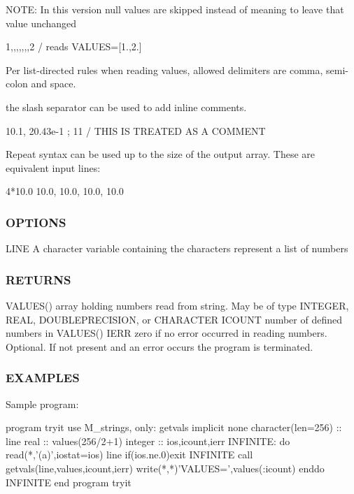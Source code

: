 N\+O\+TE\+: In this version null values are skipped instead of meaning to leave that value unchanged

1,,,,,,,2 / reads V\+A\+L\+U\+ES=\mbox{[}1.,2.\mbox{]}

Per list-\/directed rules when reading values, allowed delimiters are comma, semi-\/colon and space.

the slash separator can be used to add inline comments. \begin{DoxyVerb} 10.1, 20.43e-1 ; 11 / THIS IS TREATED AS A COMMENT
\end{DoxyVerb}


Repeat syntax can be used up to the size of the output array. These are equivalent input lines\+: \begin{DoxyVerb} 4*10.0
 10.0, 10.0, 10.0, 10.0
\end{DoxyVerb}


\subsubsection*{O\+P\+T\+I\+O\+NS}

L\+I\+NE A character variable containing the characters represent a list of numbers

\subsubsection*{R\+E\+T\+U\+R\+NS}

V\+A\+L\+U\+E\+S() array holding numbers read from string. May be of type I\+N\+T\+E\+G\+ER, R\+E\+AL, D\+O\+U\+B\+L\+E\+P\+R\+E\+C\+I\+S\+I\+ON, or C\+H\+A\+R\+A\+C\+T\+ER I\+C\+O\+U\+NT number of defined numbers in V\+A\+L\+U\+E\+S() I\+E\+RR zero if no error occurred in reading numbers. Optional. If not present and an error occurs the program is terminated.

\subsubsection*{E\+X\+A\+M\+P\+L\+ES}

Sample program\+: \begin{DoxyVerb}program tryit
use M_strings, only: getvals
implicit none
character(len=256) :: line
real               :: values(256/2+1)
integer            :: ios,icount,ierr
INFINITE: do
   read(*,'(a)',iostat=ios) line
   if(ios.ne.0)exit INFINITE
   call getvals(line,values,icount,ierr)
   write(*,*)'VALUES=',values(:icount)
enddo INFINITE
end program tryit
\end{DoxyVerb}


